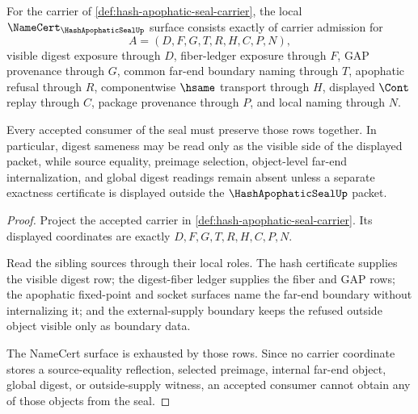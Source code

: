 \begin{theorem}
\label{thm:hash-apophatic-seal-namecert-obligations}
For the carrier of \autoref{def:hash-apophatic-seal-carrier}, the local $\NameCert_{\HashApophaticSealUp}$ surface consists exactly of carrier admission for
$$
A=(D,F,G,T,R,H,C,P,N),
$$
visible digest exposure through $D$, fiber-ledger exposure through $F$, GAP provenance through $G$, common far-end boundary naming through $T$, apophatic refusal through $R$, componentwise $\hsame$ transport through $H$, displayed $\Cont$ replay through $C$, package provenance through $P$, and local naming through $N$.

Every accepted consumer of the seal must preserve those rows together. In particular, digest sameness may be read only as the visible side of the displayed packet, while source equality, preimage selection, object-level far-end internalization, and global digest readings remain absent unless a separate exactness certificate is displayed outside the $\HashApophaticSealUp$ packet.
\end{theorem}
\begin{proof}
Project the accepted carrier in \autoref{def:hash-apophatic-seal-carrier}. Its displayed coordinates are exactly $D,F,G,T,R,H,C,P,N$.

Read the sibling sources through their local roles. The hash certificate supplies the visible digest row; the digest-fiber ledger supplies the fiber and GAP rows; the apophatic fixed-point and socket surfaces name the far-end boundary without internalizing it; and the external-supply boundary keeps the refused outside object visible only as boundary data.

The NameCert surface is exhausted by those rows. Since no carrier coordinate stores a source-equality reflection, selected preimage, internal far-end object, global digest, or outside-supply witness, an accepted consumer cannot obtain any of those objects from the seal.
\end{proof}

